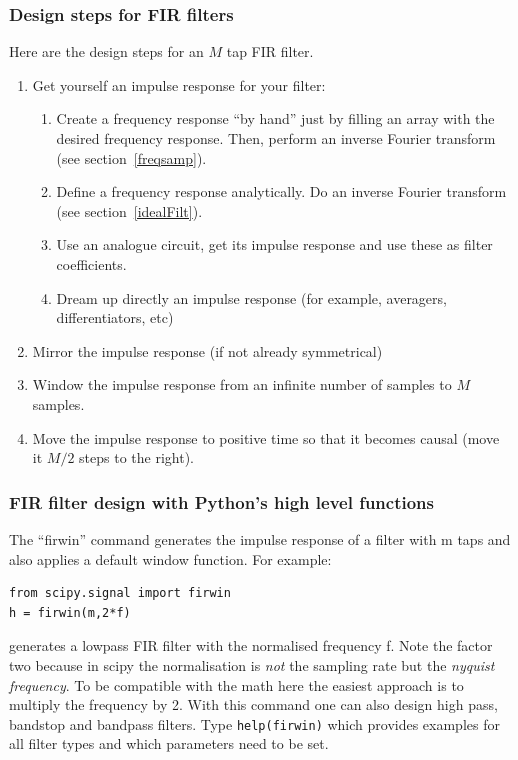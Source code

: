 \documentclass[12pt,a4paper]{article}
\begin{document}
\subsubsection{Design steps for FIR filters}
Here are the design steps for an $M$ tap FIR filter.
\begin{enumerate}
\item Get yourself an impulse response for your filter:
\begin{enumerate}
\item Create a frequency response ``by hand'' just by filling an array
with the desired frequency response. Then, perform an inverse Fourier transform
(see section~\ref{freqsamp}).
\item Define a frequency response analytically. Do an inverse Fourier
transform (see section~\ref{idealFilt}).
\item Use an analogue circuit, get its impulse response and use
these as filter coefficients.
\item Dream up directly an impulse response (for example, averagers,
differentiators, etc)
\end{enumerate}

\item Mirror the impulse response (if not already symmetrical)
\item Window the impulse response from an infinite number of samples
to $M$ samples.
\item Move the impulse response to positive time so that it becomes causal
(move it $M/2$ steps to the right).
\end{enumerate}



\subsubsection{FIR filter design with Python's high level functions}
The ``firwin'' command generates the impulse response of
a filter with m taps and also applies a default window function. For example:
\begin{verbatim}
from scipy.signal import firwin
h = firwin(m,2*f)
\end{verbatim}
generates a lowpass FIR filter with the normalised frequency f. Note the
factor two because in scipy the normalisation is \textsl{not} the sampling rate
but the \textsl{nyquist frequency}. To be compatible with the math here the
easiest approach is to multiply the frequency by 2. With this command
one can also design high pass, bandstop and bandpass filters. Type \texttt{help(firwin)}
which provides examples for all filter types and which parameters need
to be set.
\end{document}
